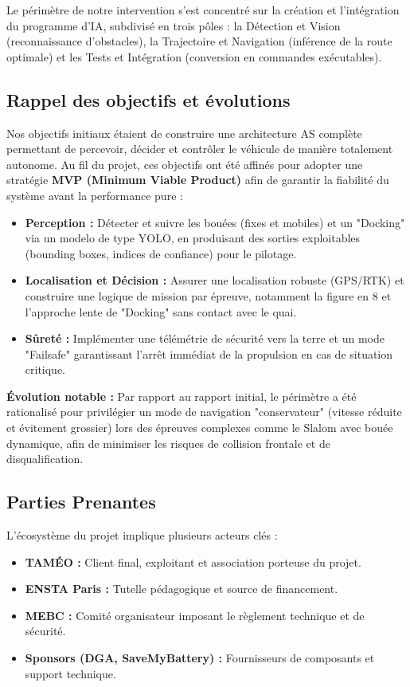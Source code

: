 \documentclass[11pt,letterpaper]{article}
\begin{document}
Le périmètre de notre intervention s'est concentré sur la création et l'intégration du programme d'IA, subdivisé en trois pôles : la Détection et Vision (reconnaissance d'obstacles), la Trajectoire et Navigation (inférence de la route optimale) et les Tests et Intégration (conversion en commandes exécutables).

\subsection{Rappel des objectifs et évolutions}
Nos objectifs initiaux étaient de construire une architecture AS complète permettant de percevoir, décider et contrôler le véhicule de manière totalement autonome. Au fil du projet, ces objectifs ont été affinés pour adopter une stratégie \textbf{MVP (Minimum Viable Product)} afin de garantir la fiabilité du système avant la performance pure :
\begin{itemize}
    \item \textbf{Perception :} Détecter et suivre les bouées (fixes et mobiles) et un "Docking" via un modelo de type YOLO, en produisant des sorties exploitables (bounding boxes, indices de confiance) pour le pilotage.
    \item \textbf{Localisation et Décision :} Assurer une localisation robuste (GPS/RTK) et construire une logique de mission par épreuve, notamment la figure en 8 et l'approche lente de "Docking" sans contact avec le quai.
    \item \textbf{Sûreté :} Implémenter une télémétrie de sécurité vers la terre et un mode "Failsafe" garantissant l'arrêt immédiat de la propulsion en cas de situation critique.
\end{itemize}

\textbf{Évolution notable :} Par rapport au rapport initial, le périmètre a été rationalisé pour privilégier un mode de navigation "conservateur" (vitesse réduite et évitement grossier) lors des épreuves complexes comme le Slalom avec bouée dynamique, afin de minimiser les risques de collision frontale et de disqualification.

\subsection{Parties Prenantes}
L'écosystème du projet implique plusieurs acteurs clés :
\begin{itemize}
    \item \textbf{TAMÉO :} Client final, exploitant et association porteuse du projet.
    \item \textbf{ENSTA Paris :} Tutelle pédagogique et source de financement.
    \item \textbf{MEBC :} Comité organisateur imposant le règlement technique et de sécurité.
    \item \textbf{Sponsors (DGA, SaveMyBattery) :} Fournisseurs de composants et support technique.
\end{itemize}
\end{document}
